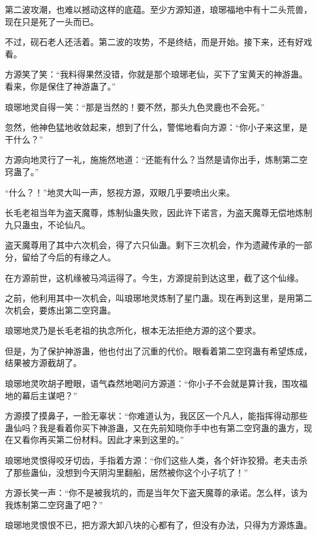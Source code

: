 \begin{this_body}
第二波攻潮，也难以撼动这样的底蕴。至少方源知道，琅琊福地中有十二头荒兽，现在只是死了一头而已。

不过，砚石老人还活着。第二波的攻势，不是终结，而是开始。接下来，还有好戏看。

方源笑了笑：“我料得果然没错，你就是那个琅琊老仙，买下了宝黄天的神游蛊。看来，你是保住了神游蛊了。”

琅琊地灵自得一笑：“那是当然的！要不然，那头九色灵鹿也不会死。”

忽然，他神色猛地收敛起来，想到了什么，警惕地看向方源：“你小子来这里，是干什么？”

方源向地灵行了一礼，施施然地道：“还能有什么？当然是请你出手，炼制第二空窍蛊了。”

“什么？！”地灵大叫一声，怒视方源，双眼几乎要喷出火来。

长毛老祖当年为盗天魔尊，炼制仙蛊失败，因此许下诺言，为盗天魔尊无偿地炼制九只蛊虫，不论仙凡。

盗天魔尊用了其中六次机会，得了六只仙蛊。剩下三次机会，作为遗藏传承的一部分，留给了今后的有缘之人。

在方源前世，这机缘被马鸿运得了。今生，方源提前到达这里，截了这个仙缘。

之前，他利用其中一次机会，叫琅琊地灵炼制了星门蛊。现在再到这里，是用第二次机会，要炼出第二空窍蛊。

琅琊地灵乃是长毛老祖的执念所化，根本无法拒绝方源的这个要求。

但是，为了保护神游蛊，他也付出了沉重的代价。眼看着第二空窍蛊有希望炼成，结果被方源截胡了。

琅琊地灵吹胡子瞪眼，语气森然地喝问方源道：“你小子不会就是算计我，围攻福地的幕后主谋吧？”

方源摸了摸鼻子，一脸无辜状：“你难道认为，我区区一个凡人，能指挥得动那些蛊仙吗？我是看着你买下神游蛊，又在先前知晓你手中也有第二空窍蛊的蛊方，现在又看你再买第二份材料。因此才来到这里的。”

琅琊地灵恨得咬牙切齿，手指着方源：“你们这些人类，各个奸诈狡猾。老夫击杀了那些蛊仙，没想到今天阴沟里翻船，居然被你这个小子坑了！”

方源长笑一声：“你不是被我坑的，而是当年欠下盗天魔尊的承诺。怎么样，该为我炼制第二空窍蛊了吧？”

琅琊地灵恨恨不已，把方源大卸八块的心都有了，但没有办法，只得为方源炼蛊。

\end{this_body}

